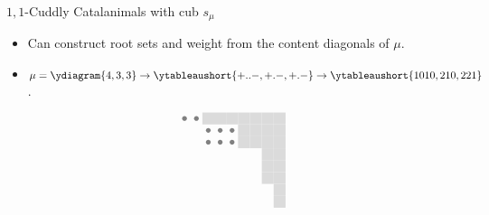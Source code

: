 \documentclass{beamer}
\newcounter{c}
\begin{document}
\begin{frame}{\(1,1\)-Cuddly Catalanimals with cub \(s_\mu\)}
  \begin{itemize}
  \item Can construct root sets and weight from the content diagonals of \(\mu\).\pause
  \item \(\mu = \ydiagram{4,3,3} \to \ytableaushort{+..-,+.-,+.-}
    \to \ytableaushort{1010,210,221}\).\pause 
  \end{itemize}
  \[\begin{array}{cr}
\begin{tikzpicture}[scale = .33]
\begin{scope}
\draw[draw = none, fill = black!14] (4,-1) rectangle (5,-2);
 \draw[draw = none, fill = black!14] (5,-1) rectangle (6,-2);
 \draw[draw = none, fill = black!14] (6,-1) rectangle (7,-2);
 \draw[draw = none, fill = black!14] (7,-1) rectangle (8,-2);
 \draw[draw = none, fill = black!14] (7,-2) rectangle (8,-3);
 \draw[draw = none, fill = black!14] (7,-3) rectangle (8,-4);
 \draw[draw = none, fill = black!14] (8,-1) rectangle (9,-2);
 \draw[draw = none, fill = black!14] (8,-2) rectangle (9,-3);
 \draw[draw = none, fill = black!14] (8,-3) rectangle (9,-4);
 \draw[draw = none, fill = black!14] (9,-1) rectangle (10,-2);
 \draw[draw = none, fill = black!14] (9,-2) rectangle (10,-3);
 \draw[draw = none, fill = black!14] (9,-3) rectangle (10,-4);
 \draw[draw = none, fill = black!14] (9,-4) rectangle (10,-5);
 \draw[draw = none, fill = black!14] (9,-5) rectangle (10,-6);
 \draw[draw = none, fill = black!14] (9,-6) rectangle (10,-7);
 \draw[draw = none, fill = black!14] (10,-1) rectangle (11,-2);
 \draw[draw = none, fill = black!14] (10,-2) rectangle (11,-3);
 \draw[draw = none, fill = black!14] (10,-3) rectangle (11,-4);
 \draw[draw = none, fill = black!14] (10,-4) rectangle (11,-5);
 \draw[draw = none, fill = black!14] (10,-5) rectangle (11,-6);
 \draw[draw = none, fill = black!14] (10,-6) rectangle (11,-7);
 \draw[draw = none, fill = black!14] (10,-7) rectangle (11,-8);
 \draw[draw = none, fill = black!14] (10,-8) rectangle (11,-9);
 \draw[draw = none, fill = gray!100] (2+0.5, -1-0.5) circle (.2);
\draw[draw = none, fill = gray!100] (3+0.5, -1-0.5) circle (.2);
\draw[draw = none, fill = gray!100] (4+0.5, -2-0.5) circle (.2);
\draw[draw = none, fill = gray!100] (5+0.5, -2-0.5) circle (.2);
\draw[draw = none, fill = gray!100] (6+0.5, -2-0.5) circle (.2);
\draw[draw = none, fill = gray!100] (4+0.5, -3-0.5) circle (.2);
\draw[draw = none, fill = gray!100] (5+0.5, -3-0.5) circle (.2);
\draw[draw = none, fill = gray!100] (6+0.5, -3-0.5) circle (.2);

\end{scope}
\end{tikzpicture}
\end{array}\]
\end{frame}
\end{document}
